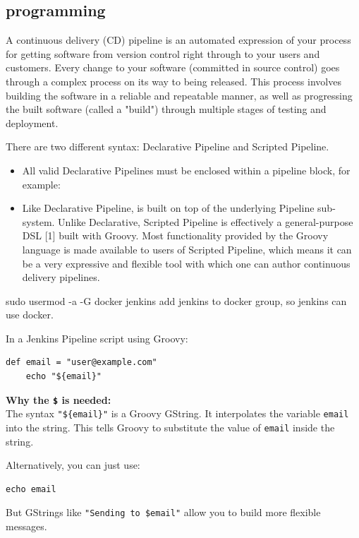 \documentclass[paper=8.5in:11in, twoside, 12pt, pagesize=pdftex]{book}
\begin{document}
\subsection{programming}
A continuous delivery (CD) pipeline is an automated expression of your process for getting software from version control right through to your users and customers. Every change to your software (committed in source control) goes through a complex process on its way to being released. This process involves building the software in a reliable and repeatable manner, as well as progressing the built software (called a "build") through multiple stages of testing and deployment.

There are two different syntax: Declarative Pipeline and Scripted Pipeline.
\begin{itemize}
	\item All valid Declarative Pipelines must be enclosed within a pipeline block, for example:
	
	\item Like Declarative Pipeline, is built on top of the underlying Pipeline sub-system. Unlike Declarative, Scripted Pipeline is effectively a general-purpose DSL [1] built with Groovy. Most functionality provided by the Groovy language is made available to users of Scripted Pipeline, which means it can be a very expressive and flexible tool with which one can author continuous delivery pipelines.	  
\end{itemize}


sudo usermod -a -G docker jenkins add jenkins to docker group, so jenkins can use docker. 

In a Jenkins Pipeline script using Groovy:

\begin{lstlisting}[basicstyle=\ttfamily, frame=single]
	def email = "user@example.com"
	echo "${email}"
\end{lstlisting}

\textbf{Why the \texttt{\$} is needed:} \\
The syntax \texttt{"\$\{email\}"} is a Groovy GString. It interpolates the variable \texttt{email} into the string. This tells Groovy to substitute the value of \texttt{email} inside the string.

Alternatively, you can just use:

\begin{lstlisting}[]
	echo email
\end{lstlisting}

But GStrings like \texttt{"Sending to \${email}"} allow you to build more flexible messages.
\end{document}
